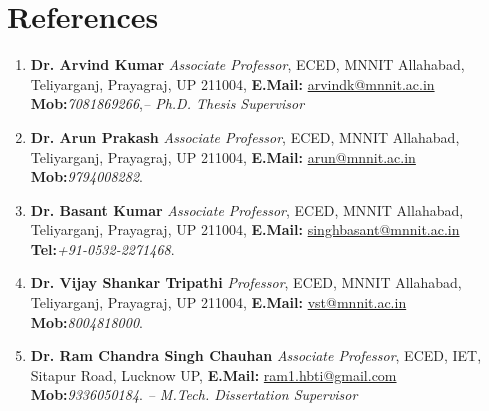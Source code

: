 \vspace{-2em}
\section{References}
\vspace{-1em}
\begin{enumerate}[label={\textbf{\arabic*}.\ }]
\item \textbf{Dr. Arvind Kumar} \emph{Associate Professor}, ECED, MNNIT Allahabad, Teliyarganj, Prayagraj, UP 211004, \textbf{E.Mail: }\href{mailto:arvindk@mnnit.ac.in}{arvindk@mnnit.ac.in} \textbf{Mob:}\emph{7081869266},\hfill \emph{-- Ph.D. Thesis Supervisor}
\item \textbf{Dr. Arun Prakash} \emph{Associate Professor}, ECED, MNNIT Allahabad, Teliyarganj, Prayagraj, UP 211004, \textbf{E.Mail: }\href{mailto:arun@mnnit.ac.in}{arun@mnnit.ac.in} \textbf{Mob:}\emph{9794008282}.
\item \textbf{Dr. Basant Kumar} \emph{Associate Professor}, ECED, MNNIT Allahabad, Teliyarganj, Prayagraj, UP 211004, \textbf{E.Mail: }\href{mailto:singhbasant@mnnit.ac.in}{singhbasant@mnnit.ac.in} \textbf{Tel:}\emph{+91-0532-2271468}.
\item \textbf{Dr. Vijay Shankar Tripathi} \emph{Professor}, ECED, MNNIT Allahabad, Teliyarganj, Prayagraj, UP 211004, \textbf{E.Mail: }\href{mailto:vst@mnnit.ac.in}{vst@mnnit.ac.in} \textbf{Mob:}\emph{8004818000}.
\item \textbf{Dr. Ram Chandra Singh Chauhan} \emph{Associate Professor}, ECED, IET, Sitapur Road, Lucknow UP, \textbf{E.Mail: }\href{mailto:ram1.hbti@gmail.com}{ram1.hbti@gmail.com} \textbf{Mob:}\emph{9336050184}. \hfill\emph{-- M.Tech. Dissertation Supervisor}
\end{enumerate}
\vspace{-2.5em}
\sectionline
